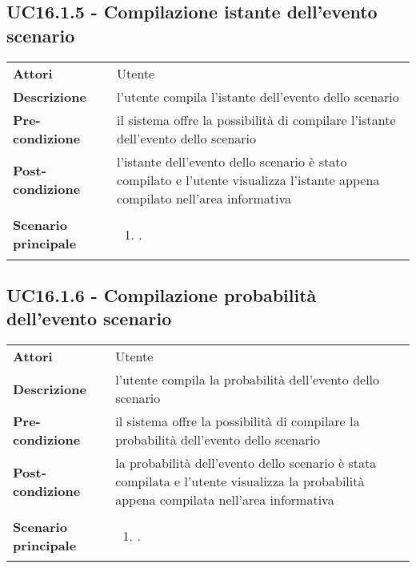 \subsection{UC16.1.5 - Compilazione istante dell'evento scenario} 
\label{sssec:UC16.1.5} 
\def\arraystretch{1.5}
\begin{tabularx}{\textwidth}{l|p{}}
	\rowcolor{I} \multicolumn{2}{c}{\color{white}\textbf{UC16.1.5 - Compilazione istante dell'evento scenario}} \\
	\toprule
	\endhead
	\textbf{Attori} & Utente\\
	\textbf{Descrizione} & l'utente compila l'istante dell'evento dello scenario\\
	\textbf{Pre-condizione} & il sistema offre la possibilità di compilare l'istante dell'evento dello scenario\\
	\textbf{Post-condizione} & l'istante dell'evento dello scenario è stato compilato e l'utente visualizza l'istante appena compilato nell'area informativa\\
	\textbf{Scenario principale} & \vspace{-1.2em}\begin{enumerate}[leftmargin=*,noitemsep,nosep]
		\item \nameref{sssec:UC16.1.5}.
	\end{enumerate}\\
	\bottomrule
\end{tabularx}
\subsection{UC16.1.6 - Compilazione probabilità dell'evento scenario} 
\label{sssec:UC16.1.6} 
\def\arraystretch{1.5}
\begin{tabularx}{\textwidth}{l|p{}}
	\rowcolor{I} \multicolumn{2}{c}{\color{white}\textbf{UC16.1.6 - Compilazione probabilità dell'evento scenario}} \\
	\toprule
	\endhead
	\textbf{Attori} & Utente\\
	\textbf{Descrizione} & l'utente compila la probabilità dell'evento dello scenario\\
	\textbf{Pre-condizione} & il sistema offre la possibilità di compilare la probabilità dell'evento dello scenario\\
	\textbf{Post-condizione} & la probabilità dell'evento dello scenario è stata compilata e l'utente visualizza la probabilità appena compilata nell'area informativa\\
	\textbf{Scenario principale} & \vspace{-1.2em}\begin{enumerate}[leftmargin=*,noitemsep,nosep]
		\item \nameref{sssec:UC16.1.6}.
	\end{enumerate}\\
	\bottomrule
\end{tabularx}
